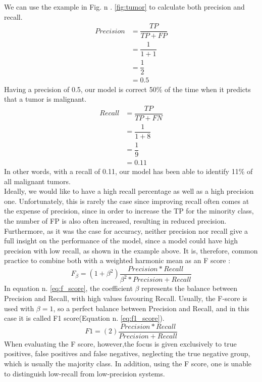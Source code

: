 We can use the example in Fig. n . \ref{fig:tumor} to calculate both precision and recall. 
\begin{equation}
\begin{aligned}
Precision &= \dfrac{TP}{TP+FP}\\
          &= \dfrac{1}{1+1}\\
          &= \dfrac{1}{2}\\
          &= 0.5
\end{aligned}
\label{eq:pre_ex}    
\end{equation}
Having a precision of 0.5, our model is correct 50\% of the time when it predicts that a tumor is malignant. 
\begin{equation}
\begin{aligned}
Recall &= \dfrac{TP}{TP+FN}\\
          &= \dfrac{1}{1+8}\\
          &= \dfrac{1}{9}\\
          &= 0.11
\end{aligned}
\label{eq:rec2}    
\end{equation}
In other words, with a recall of 0.11, our model has been able to identify 11\% of all malignant tumors. \\
Ideally, we would like to have a high recall percentage as well as a high precision one. Unfortunately, this is rarely the case since improving recall often comes at the expense of precision, since in order to increase the TP for the minority class, the number of FP is also often increased, resulting in reduced precision. \cite{10.5555/2559492}\\
Furthermore, as it was the case for accuracy, neither precision nor recall give a full insight on the performance of the model, since a model could have high precision with low recall, as shown in the example above. It is, therefore, common practice to combine both with a weighted harmonic mean as an F score \cite{Rijsbergen1974FOUNDATIONOE}:
\begin{equation}
F_\beta = (1+ \beta ^2)\dfrac{Precision * Recall}{\beta ^2* Precision + Recall}
\label{eq:f_score}    
\end{equation}
In equation n. \ref{eq:f_score}, the coefficient $\beta$ represents the balance between Precision and Recall, with high values favouring Recall. Usually, the F-score is used with $\beta =1$, so a perfect balance between Precision and Recall, and in this case it is called F1 score(Equation n. \ref{eq:f1_score}). \cite{derczynski-2016-complementarity}
\begin{equation}
F1 = (2)\dfrac{Precision * Recall}{Precision + Recall}
\label{eq:f1_score}    
\end{equation}
When evaluating the F score, however,the focus is given exclusively to true positives, false positives and false negatives, neglecting the true negative group, which is usually the majority class. In addition, using the F score, one is unable to distinguish low-recall from low-precision systems. \cite{derczynski-2016-complementarity}\\
